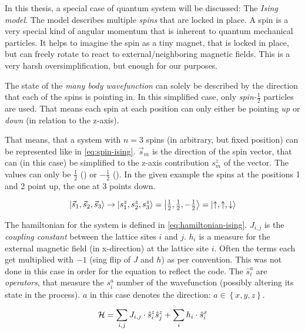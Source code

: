 In this thesis, a special case of quantum system will be discussed:
The \emph{Ising model}.
The model describes multiple \emph{spins} that are locked in place. 
A spin is a very special kind of angular momentum that is inherent to quantum mechanical particles.
It helps to imagine the spin as a tiny magnet, that is locked in place, but can freely rotate to react to external/neighboring  magnetic fields. This is a very harsh oversimplification, but enough for our purposes.

The state of the \emph{many body wavefunction} can solely be described by the direction that each of the spins is pointing in. In this simplified case, only \emph{spin-$\frac{1}{2}$} particles are used. That means each spin at each position can only either be pointing \emph{up} \up or \emph{down} \down (in relation to the z-axis).

That means, that a system with $n=3$ spins (in arbitrary, but fixed position) can be represented like in \autoref{eq:spin-ising}. $\vec{s}_m$ is the direction of the spin vector, that can (in this case) be simplified to the z-axis contribution $s^z_m$ of the vector. The values can only be $\frac{1}{2}$ (\up) or $-\frac{1}{2}$ (\down).
In the given example the spins at the positions 1 and 2 point up, the one at 3 points down.

\begin{equation}
    \label{eq:spin-ising}
    \ket{\vec{s}_1, \vec{s}_2, \vec{s}_3} \rightarrow \ket{s^z_{1}, s^z_{2}, s^z_{3}} = \ket{\tfrac{1}{2}, \tfrac{1}{2}, -\tfrac{1}{2}} = \ket{\uparrow, \uparrow, \downarrow}
\end{equation}

The hamiltonian for the system is defined in \autoref{eq:hamiltonian-ising}. $J_{i, j}$ is the \emph{coupling constant} between the lattice sites $i$ and $j$. $h_i$ is a measure for the external magnetic field (in x-direction) at the lattice site $i$. Often the terms each get multiplied with $-1$ (sing flip of $J$ and $h$) as per convention. This was not done in this case in order for the equation to reflect the code. The $\hat{s}^a_i$ are \emph{operators}, that measure the $s^a_i$ number of the wavefunction (possibly altering its state in the process).
$a$ in this case denotes the direction: $a \in \left\{x,y,z\right\}$.

\begin{equation}
    \label{eq:hamiltonian-ising}
    \mathcal{H} = \sum\limits_{i, j} J_{i, j} \cdot \hat{s}^z_i \hat{s}^z_j + \sum\limits_{i} h_i \cdot \hat{s}^x_i
\end{equation}

